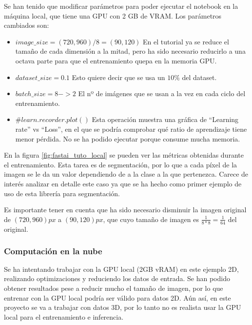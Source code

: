 Se han tenido que modificar parámetros para poder ejecutar el notebook en la máquina local, que tiene una GPU con 2 GB de VRAM. Los parámetros cambiados son:
\begin{itemize}
\item $image\_size = (720, 960) / 8 = (90, 120)$ En el tutorial ya se reduce el tamaño de cada dimensión a la mitad, pero ha sido necesario reducirlo a una octava parte para que el entrenamiento quepa en la memoria GPU.
\item $dataset\_size = 0.1$ Esto quiere decir que se usa un $10\%$ del dataset.
\item $batch\_size = 8 -> 2$ El nº de imágenes que se usan a la vez en cada ciclo del entrenamiento.
\item $\#learn.recorder.plot()$ Esta operación muestra una gráfica de “Learning rate” vs “Loss”, en el que se podría comprobar qué ratio de aprendizaje tiene menor pérdida. No se ha podido ejecutar porque consume mucha memoria.
\end{itemize}


En la figura \ref{fig:fastai_tuto_local} se pueden ver las métricas obtenidas durante el entrenamiento. Esta tarea es de segmentación, por lo que a cada píxel de la imagen se le da un valor dependiendo de a la clase a la que pertenezca. Carece de interés analizar en detalle este caso ya que se ha hecho como primer ejemplo de uso de esta librería para segmentación.

Es importante tener en cuenta que ha sido necesario disminuir la imagen original de $(720, 960)px$ a $(90, 120)px$, que cuyo tamaño de imagen es $\frac{1}{8*8}=\frac{1}{64}$ del original.

\subsubsection{Computación en la nube}\label{sec:cloud_dev}

Se ha intentando trabajar con la GPU local (2GB vRAM) en este ejemplo 2D, realizando optimizaciones y reduciendo los datos de entrada. Se han podido obtener resultados pese a reducir mucho el tamaño de imagen, por lo que entrenar con la GPU local podría ser válido para datos 2D. Aún así, en este proyecto se va a trabajar con datos 3D, por lo tanto no es realista usar la GPU local para el entrenamiento e inferencia.

